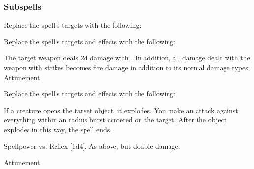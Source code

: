\subsubsection{Subspells}
Replace the spell's targets with the following:
\begin{spellcontent}
\begin{augmenttargetinginfo}
\end{augmenttargetinginfo}
\end{spellcontent}
Replace the spell's targets and effects with the following:
\begin{spellcontent}
\begin{augmenttargetinginfo}
\end{augmenttargetinginfo}
\begin{augmenteffects}
\spelleffect
The target weapon deals \plus2d damage with .
In addition, all damage dealt with the weapon with strikes becomes fire damage in addition to its normal damage types.
\spelldur Attunement
\end{augmenteffects}
\end{spellcontent}
Replace the spell's targets and effects with the following:
\begin{spellcontent}
\begin{augmenttargetinginfo}
\end{augmenttargetinginfo}
\begin{augmenteffects}
\spelleffect
If a creature opens the target object, it explodes.
You make an attack against everything within an \areamed radius burst centered on the target.
After the object explodes in this way, the spell ends.
\begin{spellattack}{Spellpower vs. Reflex}
\spellsuccess {}[1d4].
\spellcritical As above, but double damage.
\end{spellattack}
\spelldur Attunement
\end{augmenteffects}
\end{spellcontent}
